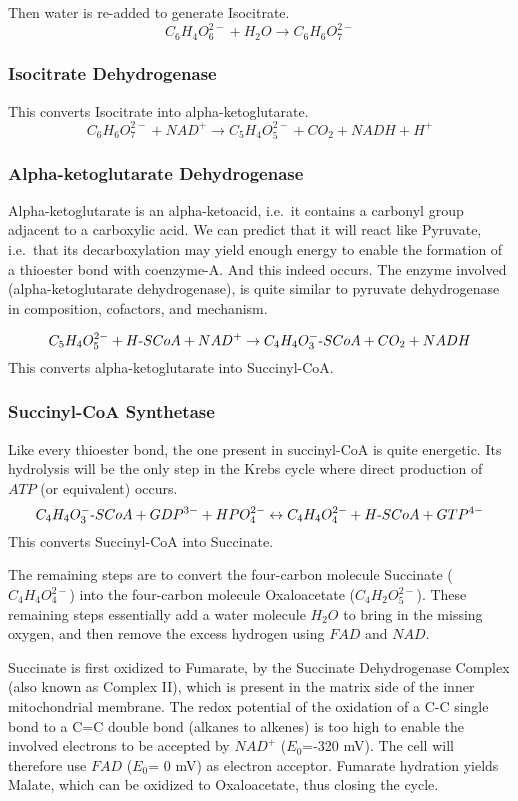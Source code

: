 \documentclass[a4paper,14pt]{extarticle}
\def\mhyphen{{\hbox{-}}}
\begin{document}
Then water is re-added to generate Isocitrate.
\[
    C_6H_4O_6^{2-} + H_2O \rightarrow C_6H_6O_7^{2-}
\]

\subsubsection{Isocitrate Dehydrogenase}
This converts Isocitrate into alpha-ketoglutarate.
\[
    C_6H_6O_7^{2-} + NAD^+ \rightarrow C_5H_4O_5^{2-} + CO_2 + NADH + H^+
\]

\subsubsection{Alpha-ketoglutarate Dehydrogenase}
Alpha-ketoglutarate is an alpha-ketoacid, i.e.\ it contains a carbonyl group adjacent to a
carboxylic acid. We can predict that it will react like Pyruvate, i.e.\ that its
decarboxylation may yield enough energy to enable the formation of a thioester bond with
coenzyme-A. And this indeed occurs. The enzyme involved (alpha-ketoglutarate dehydrogenase),
is quite similar to pyruvate dehydrogenase in composition, cofactors, and mechanism.

\[
    C_5H_4O_5^{2-} + H{\mhyphen}SCoA + NAD^+ \rightarrow
    C_4H_4O_3^{-}{\mhyphen}SCoA + CO_2 + NADH
\]
This converts alpha-ketoglutarate into Succinyl-CoA.

\subsubsection{Succinyl-CoA Synthetase}
Like every thioester bond, the one present in succinyl-CoA is quite energetic. Its
hydrolysis will be the only step in the Krebs cycle where direct production of
$\mathit{ATP}$ (or equivalent) occurs.
\[
    C_4H_4O_3^{-}{\mhyphen}SCoA + GDP^{3-} + HPO_4^{2-} \leftrightarrow
    C_4H_4O_4^{2-} + H{\mhyphen}SCoA + GTP^{4-}
\]
This converts Succinyl-CoA into Succinate.

The remaining steps are to convert the four-carbon molecule Succinate ($C_4H_4O_4^{2-}$)
into the four-carbon molecule Oxaloacetate ($C_4H_2O_5^{2-}$). These remaining steps
essentially add a water molecule $H_2O$ to bring in the missing oxygen, and then remove
the excess hydrogen using $\mathit{FAD}$ and $\mathit{NAD}$.

Succinate is first oxidized to Fumarate, by the Succinate Dehydrogenase Complex (also
known as Complex II), which is present in the matrix side of the inner mitochondrial
membrane. The redox potential of the oxidation of a C-C single bond to a C=C double bond
(alkanes to alkenes) is too high to enable the involved electrons to be accepted by
$\mathit{NAD^+}$ ($E_0$=-320 mV). The cell will therefore use $\mathit{FAD}$ ($E_0$= 0 mV)
as electron acceptor. Fumarate hydration yields Malate, which can be oxidized to
Oxaloacetate, thus closing the cycle.
\end{document}
